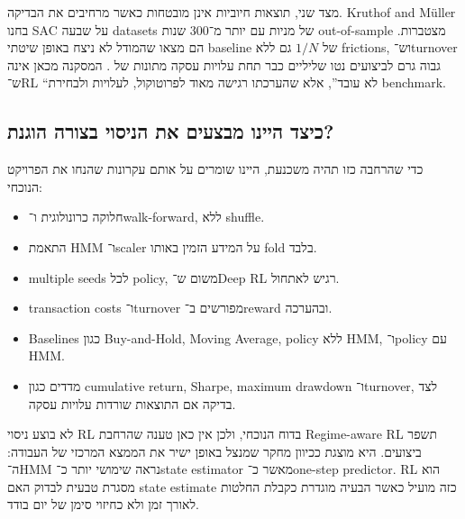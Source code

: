 מצד שני, תוצאות חיוביות אינן מובטחות כאשר מרחיבים את הבדיקה. Kruthof and M{\"u}ller בחנו SAC על שבעה datasets של מניות עם יותר מ־300 שנות out-of-sample מצטברות. הם מצאו שהמודל לא ניצח באופן שיטתי baseline של \(1/N\) גם ללא frictions, וש־turnover גבוה גרם לביצועים נטו שליליים כבר תחת עלויות עסקה מתונות של  \cite{kruthof2025beat1n}. המסקנה מכאן אינה ש־RL ``לא עובד'', אלא שהערכתו רגישה מאוד לפרוטוקול, לעלויות ולבחירת benchmark.

\subsection{כיצד היינו מבצעים את הניסוי בצורה הוגנת?}

כדי שהרחבה כזו תהיה משכנעת, היינו שומרים על אותם עקרונות שהנחו את הפרויקט הנוכחי:

\begin{itemize}
    \item חלוקה כרונולוגית ו־walk-forward, ללא shuffle.
    \item התאמת HMM ו־scaler על המידע הזמין באותו fold בלבד.
    \item multiple seeds לכל policy, משום ש־Deep RL רגיש לאתחול.
    \item transaction costs ו־turnover מפורשים ב־reward ובהערכה.
    \item Baselines כגון Buy-and-Hold, Moving Average, policy ללא HMM, ו־policy עם HMM.
    \item מדדים כגון cumulative return, Sharpe, maximum drawdown ו־turnover, לצד בדיקה אם התוצאות שורדות עלויות עסקה.
\end{itemize}

לא בוצע ניסוי RL בדוח הנוכחי, ולכן אין כאן טענה שהרחבת Regime-aware RL תשפר ביצועים. היא מוצגת ככיוון מחקר שמנצל באופן ישיר את הממצא המרכזי של העבודה: ה־HMM נראה שימושי יותר כ־state estimator מאשר כ־one-step predictor. RL הוא מסגרת טבעית לבדוק האם state estimate כזה מועיל כאשר הבעיה מוגדרת כקבלת החלטות לאורך זמן ולא כחיזוי סימן של יום בודד.
